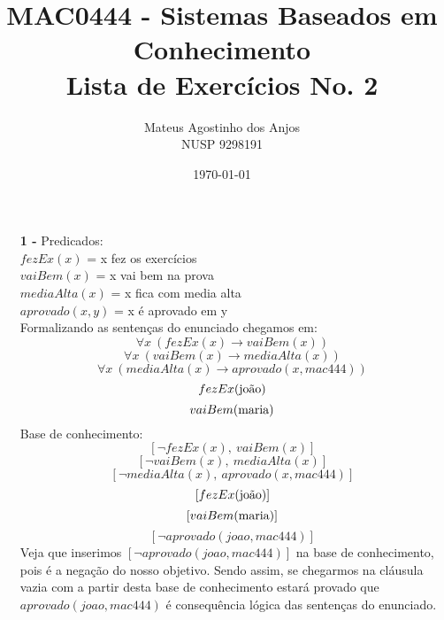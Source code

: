 \documentclass[12pt]{article}
\title{MAC0444 - Sistemas Baseados em Conhecimento \\
Lista de Exercícios No. 2
}
\author{Mateus Agostinho dos Anjos\\NUSP 9298191}
\date{\today}
\begin{document}
	\maketitle
	\begin{itemize}
		\item[\textbf{1 -}]
			\hfill\newline
			Predicados:\\
			$fezEx(x)$ = x fez os exercícios\\
			$vaiBem(x)$ = x vai bem na prova\\
			$mediaAlta(x)$ = x fica com media alta\\
			$aprovado(x, y)$ = x é aprovado em y \\
			\newline
			Formalizando as sentenças do enunciado chegamos em:\\
			$$\forall x \ (fezEx(x) \rightarrow vaiBem(x))$$
			$$\forall x \ (vaiBem(x) \rightarrow mediaAlta(x))$$
			$$\forall x \ (mediaAlta(x) \rightarrow aprovado(x, mac444))$$
			$$fezEx(\textnormal{joão})$$
			$$vaiBem(\textnormal{maria})$$
			Base de conhecimento:\\
			$$[\neg fezEx(x), \ vaiBem(x)]$$
			$$[\neg vaiBem(x), \ mediaAlta(x)]$$
			$$[\neg mediaAlta(x), \ aprovado(x, mac444)] $$
			$$[fezEx(\textnormal{joão})]$$
			$$[vaiBem(\textnormal{maria})]$$
			$$[\neg aprovado(joao, mac444)]$$
			Veja que inserimos $[\neg aprovado(joao, mac444)]$ na base de conhecimento, pois
			é a negação do nosso objetivo. Sendo assim, se chegarmos na cláusula vazia com
			a partir desta base de conhecimento estará provado que $aprovado(joao, mac444)$
			é consequência lógica das sentenças do enunciado.
	\end{itemize}
\end{document}
